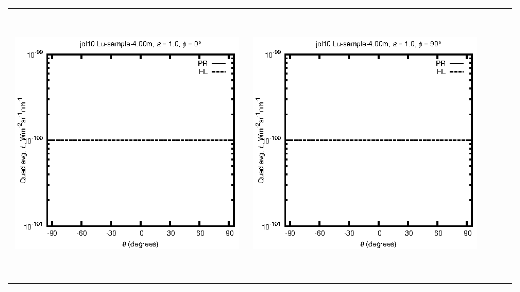 \begin{tabular}{c c c c}
\includegraphics[height=7cm]{../eps/jol10_Lu_sample_4.00m_fwd.eps} &
\includegraphics[height=7cm]{../eps/jol10_Lu_sample_4.00m_cross.eps} \\
\end{tabular}

\pagebreak

